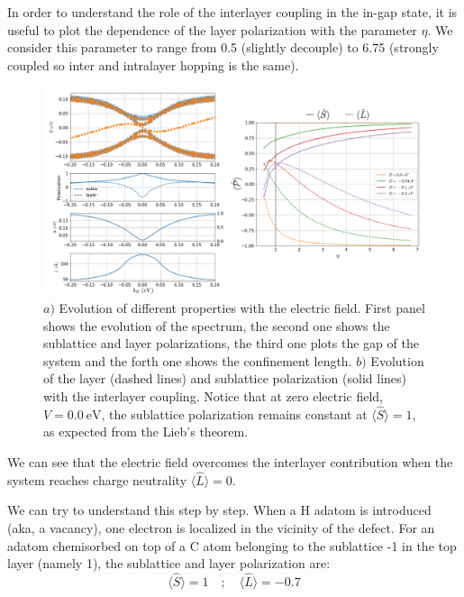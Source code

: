In order to understand the role of the interlayer coupling in the in-gap state, it is useful to plot the dependence of the layer polarization with the parameter $\eta$. We consider this parameter to range from 0.5 (slightly decouple) to 6.75 (strongly coupled so inter and intralayer hopping is the same).
\begin{figure}[!ht!]
\centering
\includegraphics[width=\textwidth]{artlat/fig/polarization.pdf}
\vspace{-15pt}
\caption{$a)$ Evolution of different properties with the electric field. First panel shows the evolution of the spectrum, the second one shows the sublattice and layer polarizations, the third one plots the gap of the system and the forth one shows the confinement length. $b)$ Evolution of the layer (dashed lines) and sublattice polarization (solid lines) with the interlayer coupling. Notice that at zero electric field, $V=\SI{0.0}{\eV}$, the sublattice polarization remains constant at $\langle\hat{S}\rangle=1$, as expected from the Lieb's theorem.}
\label{pol}
\end{figure}
\FloatBarrier
We can see that the electric field overcomes the interlayer contribution when the system reaches charge neutrality $\langle\hat{L}\rangle=0$.

We can try to understand this step by step. When a H adatom is introduced (aka, a vacancy), one electron is localized in the vicinity of the defect. %
For an adatom chemisorbed on top of a C atom belonging to the sublattice -1 in the top layer (namely 1), the sublattice and layer polarization are:
\begin{equation*}
  \langle\hat{S}\rangle = 1 \quad;\quad
  \langle\hat{L}\rangle = -0.7
\end{equation*}


